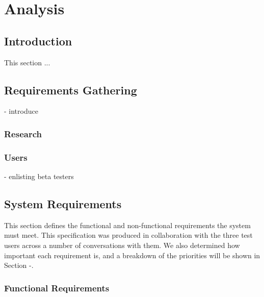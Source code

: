 \chapter{Analysis}
\section{Introduction}
This section ...

\section{Requirements Gathering}
- introduce

\subsection{Research}

\subsection{Users}
- enlisting beta testers

\pagebreak
\section{System Requirements}
This section defines the functional and non-functional requirements the system must meet. This specification was produced in collaboration with the three test users across a number of conversations with them. We also determined how important each requirement is, and a breakdown of the priorities will be shown in Section -.

\subsection{Functional Requirements}

